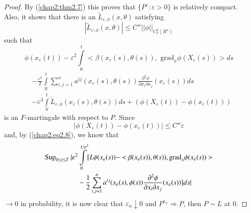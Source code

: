 \begin{proof}
By (\ref{chap2:thm2.7}) this proves that $\{P^\varepsilon: \varepsilon > 0 \}$ is
relatively compact. Also, it shows that there is an
$\tilde{L}_{\varepsilon, \phi}(x, \theta)$ satisfying	 
$$
|\tilde{L}_{\varepsilon, \phi}(x, \theta)| \le C'' || \phi ||_{C^3_b(R^n)} 
$$
such that 
$$
\phi(x_\varepsilon(t))-\varepsilon^2 \int \limits^t_0 <
\beta(x_\varepsilon(s), \theta(s)), \text{ grad}_x \phi(X_\varepsilon(s))> ds 
$$
\begin{align*}
& - \frac{\varepsilon^2}{2} \int\limits^t_0
  \sum^n_{i,j=1}a^{ij}(x_\varepsilon(s), 
  \theta(s)) \frac{\partial^2 \phi}{\partial x_i \partial x_j}
  (x_\varepsilon(s))ds \\ 
& - \varepsilon^3 \int\limits^t_0 \tilde{L}_{\varepsilon ,
    \phi}(x_\varepsilon(s), \theta(s))ds + (\phi(X_\varepsilon(t))
  -\phi(x_\varepsilon(t)))  
\end{align*}
is an $F$-martingale with respect to $P$. Since
$$
| \phi(X_\varepsilon(t)) - \phi(x_\varepsilon(t)) | \le C'' \varepsilon 
$$
and, by (\ref{chap2:eq2.8}), we know that
\begin{align*}
\operatorname{Sup}_{0 \le t \le T} | \varepsilon^2 & \int \limits^{t/ \varepsilon^2}_0
    [L \phi(x_\varepsilon(s)) - < \beta (x_\varepsilon(s)),
      \theta(s)), {\rm grad}_x \phi(x_\varepsilon(s))  > \\
& - \frac{1}{2}
      \sum^n_{i,j=1} a^{ij}(x_\varepsilon(s), \phi(s))
      \frac{\partial^2 \phi}{\partial x_i \partial x_j}
      (x_\varepsilon(s)) ] ds| 
\end{align*}
$\rightarrow 0$ in probability, it is now clear that $\varepsilon_n 
\downarrow 0$ and $P^{\varepsilon_n} \Rightarrow P$, then $P \sim L$ at
0.
\end{proof}

